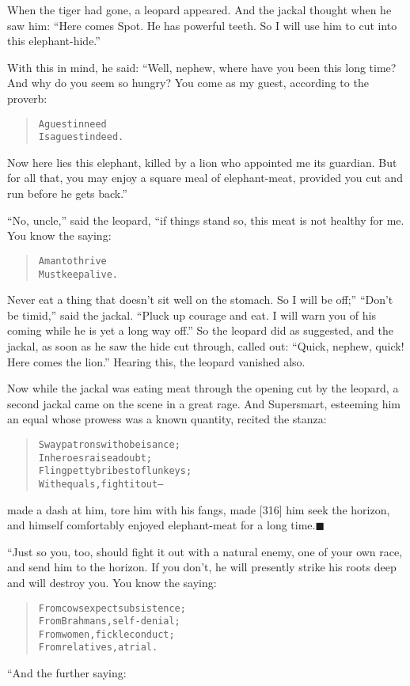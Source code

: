 \documentclass[article, twoside, 14pt]{memoir}
\newcommand{\qed}{\hfill \ensuremath{\blacksquare}}
\renewenvironment{verbatim}{%
\begin{quote}%
\vskip -10pt%
\begin{alltt}\normalfont\large}{\end{alltt}%
\end{quote}%
\vskip -10pt
} %
\begin{document}
When the tiger had gone, a leopard appeared. And the jackal thought
when he saw him:
``Here comes Spot. He has powerful teeth. So I will use him to cut into this elephant-hide.''

With this in mind, he said: “Well, nephew, where have you been this
long time? And why do you seem so hungry? You come as my guest,
according to the proverb:

\begin{verbatim}
A guest in need
Is a guest indeed.
\end{verbatim}
Now here lies this elephant, killed by a lion who appointed me its
guardian. But for all that, you may enjoy a square meal of
elephant-meat, provided you cut and run before he gets back.”

``No, uncle,'' said the leopard, “if things stand so, this meat is
not healthy for me. You know the saying:

\begin{verbatim}
A man to thrive
Must keep alive.
\end{verbatim}
Never eat a thing that doesn't sit well on the stomach. So I will
be off;” ``Don't be timid,'' said the jackal.
``Pluck up courage and eat. I will warn you of his coming while he is yet a long way off.''
So the leopard did as suggested, and the jackal, as soon as he saw
the hide cut through, called out:
``Quick, nephew, quick! Here comes the lion.'' Hearing this, the
leopard vanished also.

Now while the jackal was eating meat through the opening cut by the
leopard, a second jackal came on the scene in a great rage. And
Supersmart, esteeming him an equal whose prowess was a known
quantity, recited the stanza:

\begin{verbatim}
Sway patrons with obeisance;
    In heroes raise a doubt;
Fling petty bribes to flunkeys;
    With equals, fight it out--
\end{verbatim}
made a dash at him, tore him with his fangs, made [316] him seek
the horizon, and himself comfortably enjoyed elephant-meat for a
long time.\hyperref[s76]{\qed}

“Just so you, too, should fight it out with a natural enemy, one of
your own race, and send him to the horizon. If you don't, he will
presently strike his roots deep and will destroy you. You know the
saying:

\begin{verbatim}
From cows expect subsistence;
    From Brahmans, self-denial;
From women, fickle conduct;
    From relatives, a trial.
\end{verbatim}
“And the further saying:
\end{document}
